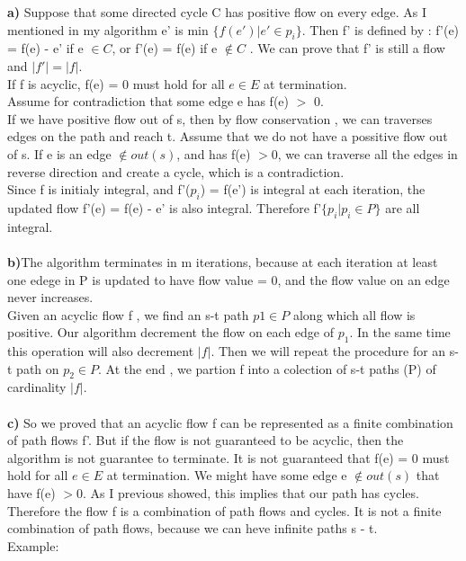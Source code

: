\documentclass[11 pt]{article}
\begin{document}
\textbf{a)} Suppose that some directed cycle C has positive flow on every edge. As I mentioned in my algorithm e' is min $\{ f(e') | e' \in p_i \}$.   Then f' is defined by :  f'(e) = f(e) - e' if e $\in C$, or f'(e) = f(e) if e $\notin C$ . We can prove that f' is still a flow and $|f'| = |f|.$\\
If f is acyclic, f(e) = 0 must hold for all $e \in E$ at termination. \\
 Assume for contradiction that some edge e has f(e) $>$ 0. \\
 If we have positive flow out of s, then by flow conservation , we can traverses edges on the path and reach t. Assume that we do not have a possitive flow out of s. If e is an edge $\notin out(s)$, and has f(e) $>$0, we can traverse all the edges in reverse direction and create a cycle, which is a contradiction.\\
Since f is initialy integral, and f'($p_i$) = f(e')  is integral at each iteration, the updated flow f'(e) = f(e) - e' is also integral. Therefore f'$ \{p_i | p_i \in P \}$ are all integral. \\ \\


\textbf{b)}The algorithm terminates in m iterations, because at each iteration at least one edege in P is updated to have flow value = 0, and the flow value on an edge never increases.  \\
Given an acyclic flow f , we find an s-t path $p1 \in P$ along which all flow is positive. Our algorithm decrement the flow on each edge of $p_1$. In the same time this operation will also decrement $|f|$. Then we will repeat the procedure for an s-t path on $p_2 \in P$. At the end , we partion f into a colection of s-t paths (P) of cardinality $|f|$.\\ \\


\textbf{c)} So we proved that an acyclic flow f can be represented as a finite combination of path  flows f'.  But if the flow is not guaranteed to be acyclic, then the algorithm is not guarantee to terminate. It is not guaranteed that f(e) = 0 must hold for all $e \in E$ at termination. We might have some edge e $\notin out(s)$ that have f(e) $> $0. As I previous showed, this implies that our path has cycles. Therefore the flow f is a combination of path flows and cycles. It is not a finite combination of path flows, because we can heve infinite paths s - t. \\
Example:
\end{document}
